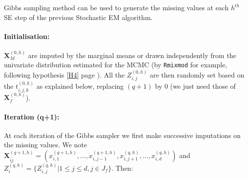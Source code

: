 \documentclass[12pt,a4paper]{report}
\begin{document}
		Gibbs sampling method can be used to generate the missing values at each $h^{th}$ SE step of the previous Stochastic EM algorithm. 
		\paragraph{Initialisation:}  %
		$\boldsymbol{X}_M^{(0,h)}$ are imputed by the marginal means or drawn independently from the univariate distribution estimated for the MCMC (by {\tt Rmixmod} for example, following hypothesis \ref{H4} page \pageref{H4}). All the $Z_{i,j}^{(0,h)}$ are then randomly set based on the $t_{i,j,k}^{(0,h)}$ as explained below, replacing $(q+1)$ by $0$ (we just need those of $\boldsymbol{X}_f^{(0,h)}$). 
		\paragraph{Iteration (q+1):} At each iteration of the Gibbs sampler we first make successive imputations on the missing values. We note $\boldsymbol{X}^{(q+1,h)}_{\bar{ij}}=(x_{i,1}^{(q+1,h)},\dots, x^{(q+1,h)}_{i,j-1},x_{i,j+1}^{(q,h)},\dots, x_{i,d}^{(q,h)})$ and $Z_{i}^{(q,h)}=\{Z_{i,j}^{(q,h)}|1\leq j \leq d, j\in J_f \}$. Then: 
\end{document}
